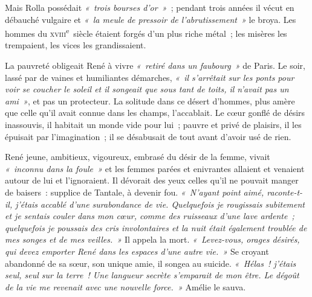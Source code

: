 \documentclass[french,twoside]{book} %
\begin{document}
\noindent Mais Rolla possédait \emph{« trois bourses d’or »} ; pendant trois années il vécut en débauché vulgaire et \emph{« la meule de pressoir de l’abrutissement »} le broya. Les hommes du \textsc{xviii}\textsuperscript{e} siècle étaient forgés d’un plus riche métal ; les misères les trempaient, les vices les grandissaient.\par
La pauvreté obligeait René à vivre \emph{« retiré dans un faubourg »} de Paris. Le soir, lassé par de vaines et humiliantes démarches, \emph{« il s’arrêtait sur les ponts pour voir se coucher le soleil et il songeait que sous tant de toits, il n’avait pas un ami »}, et pas un protecteur. La solitude dans ce désert d’hommes, plus amère que celle qu’il avait connue dans les champs, l’accablait. Le cœur gonflé de désirs inassouvis, il habitait un monde vide pour lui ; pauvre et privé de plaisirs, il les épuisait par l’imagination ; il se désabusait de tout avant d’avoir usé de rien.\par
René jeune, ambitieux, vigoureux, embrasé du désir de la femme, vivait \emph{« inconnu dans la foule »} et les femmes parées et enivrantes allaient et venaient autour de lui et l’ignoraient. Il dévorait des yeux celles qu’il ne pouvait manger de baisers : supplice de Tantale, à devenir fou. \emph{« N’ayant point aimé, raconte-t-il, j’étais accablé d’une surabondance de vie. Quelquefois je rougissais subitement et je sentais couler dans mon cœur, comme des ruisseaux d’une lave ardente ; quelquefois je poussais des cris involontaires et la nuit était également troublée de mes songes et de mes veilles. »} Il appela la mort. \emph{« Levez-vous, orages désirés, qui devez emporter René dans les espaces d’une autre vie. »} Se croyant abandonné de sa sœur, son unique amie, il songea au suicide. \emph{« Hélas ! j’étais seul, seul sur la terre ! Une langueur secrète s’emparait de mon être. Le dégoût de la vie me revenait avec une nouvelle force. »} Amélie le sauva.\par
\end{document}

